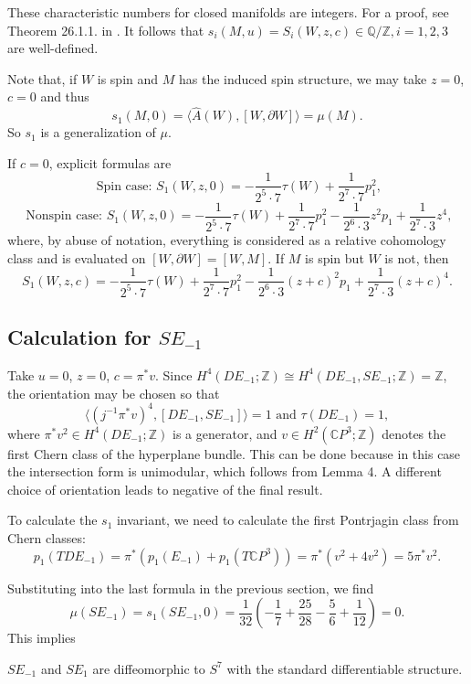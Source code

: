\documentclass[twoside]{article}
\begin{document}
These characteristic numbers for closed manifolds are integers. For a proof, see Theorem 26.1.1. in \cite{hirzebruchtopological}. It follows that $s_i(M, u) = S_i(W,z,c) \in   \mathbb{Q}/\mathbb{Z}, i = 1,2,3$ are well-defined. 

Note that, if $W$ is spin and $M$ has the induced spin structure, we may take $z = 0$, $c = 0$ and thus 
\[
s_1(M, 0) = \langle \widehat{A}(W),[W, \partial W]\rangle = \mu(M). 
\]
So $s_1$ is a generalization of $\mu$. 

If $c = 0$, explicit formulas are
\[
\text { Spin case: } S_{1}(W, z,0) = -\frac{1}{2^{5}  \cdot 7}  \tau(W) + \frac{1}{2^{7}  \cdot 7} p_{1}^{2},  
\]
\[
\text { Nonspin case: } S_{1}(W, z,0) = -\frac{1}{2^{5}  \cdot 7} \tau(W) + \frac{1}{2^{7}  \cdot 7} p_{1}^{2} 
-\frac{1}{2^{6}  \cdot 3} z^{2} p_{1} + \frac{1}{2^{7}  \cdot 3} z^{4} , 
\]
where, by abuse of notation, everything is considered as a relative cohomology class and is evaluated on $[W, \partial W] = [W, M]$. If $M$ is spin but $W$ is not, then
\[
S_{1}(W, z,c) = -\frac{1}{2^{5}  \cdot 7} \tau(W) + \frac{1}{2^{7}  \cdot 7} p_{1}^{2} 
-\frac{1}{2^{6}  \cdot 3} (z + c)^{2} p_{1} + \frac{1}{2^{7}  \cdot 3} (z + c)^{4} . 
\]





\subsection{Calculation for \texorpdfstring{$SE_{-1}$}{SE{-1}}}
Take $u = 0$, $z = 0$, $c = \pi^*v$. Since $H^4(DE_{-1};\mathbb{Z}) \cong  H^4(DE_{-1},SE_{-1};\mathbb{Z}) = \mathbb{Z}$, the orientation may be chosen so that
\[
\langle(j^{-1}\pi^*v)^4,[DE_{-1},SE_{-1}]\rangle = 1\text{ and }\tau(DE_{-1}) = 1, 
\]
where $\pi^*v^2\in H^4(DE_{-1};\mathbb{Z})$ is a generator, and $v\in H^2(\mathbb{C}P^3;\mathbb{Z})$ denotes the first Chern class of the hyperplane bundle. This can be done because in this case the intersection form is unimodular, which follows from Lemma 4. A different choice of orientation leads to negative of the final result. 

To calculate the $s_1$ invariant, we need to calculate the first Pontrjagin class from Chern classes: 
\[
p_1(TDE_{-1}) = \pi^*(p_1(E_{-1}) + p_1(T\mathbb{C}P^3)) = \pi^*(v^2 + 4v^2) = 5\pi^*v^2. \]

Substituting into the last formula in the previous section, we find
\[
\mu(SE_{-1}) = s_1(SE_{-1},0) = \frac{1}{32}\left(-\frac{1}{7} + \frac{25}{28}-\frac{5}{6} + \frac{1}{12}\right) = 0. 
\]
This implies
\begin{thm}
	$SE_{-1}$ and $SE_{1}$ are diffeomorphic to $S^7$ with the standard differentiable structure. 
\end{thm}
\end{document}
